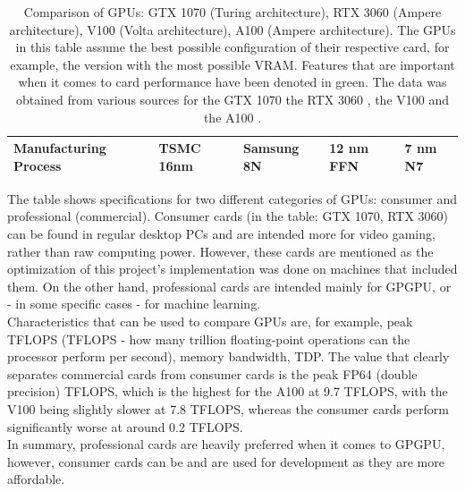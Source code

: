\begin{table}[h!]
\begin{tabular}{|>{\raggedright\arraybackslash\bfseries\scriptsize}m{2.7cm}|>{\scriptsize}m{2.7cm}|>{\scriptsize}m{2.7cm}|>{\scriptsize}m{2.7cm}|>{\scriptsize}m{2.7cm}|}
		\hline
		Manufacturing Process & TSMC 16nm & Samsung 8N & 12 nm FFN & 7 nm N7\\
		\hline
	\end{tabular}
	\caption{Comparison of GPUs: GTX 1070 (Turing architecture), RTX 3060 (Ampere architecture), V100 (Volta architecture), A100 (Ampere architecture). The GPUs in this table assume the best possible configuration of their respective card, for example, the version with the most possible VRAM. Features that are important when it comes to card performance have been denoted in green. The data was obtained from various sources for the GTX 1070 \cite{Hagedoorn6October2016, oaUUFoT7oI5ApIyY, Smith18May2016, jAnwkq6mMKYTLUOB} the RTX 3060 \cite{Walton7July2021, wGXr33zSUweXiQMY, SMhyh0H3oh3nlda0, May1December2020}, the V100 \cite{NvidiaAugust2017} and the A100 \cite{soj8qSRbfefUdi8Y, rfiOEXAGDlcAOxF3}.}
	\label{Table:Nvidia-gpu-details-comparison}
\end{table}

The table shows specifications for two different categories of GPUs: consumer and professional (commercial). Consumer cards (in the table: GTX 1070, RTX 3060) can be found in regular desktop PCs and are intended more for video gaming, rather than raw computing power. However, these cards are mentioned as the optimization of this project's implementation was done on machines that included them. On the other hand, professional cards are intended mainly for GPGPU, or - in some specific cases - for machine learning. \\
Characteristics that can be used to compare GPUs are, for example, peak TFLOPS (TFLOPS - how many trillion floating-point operations can the processor perform per second), memory bandwidth, TDP. The value that clearly separates commercial cards from consumer cards is the peak FP64 (double precision) TFLOPS, which is the highest for the A100 at 9.7 TFLOPS, with the V100 being slightly slower at 7.8 TFLOPS, whereas the consumer cards perform significantly worse at around 0.2 TFLOPS. \\
In summary, professional cards are heavily preferred when it comes to GPGPU, however, consumer cards can be and are used for development as they are more affordable.



